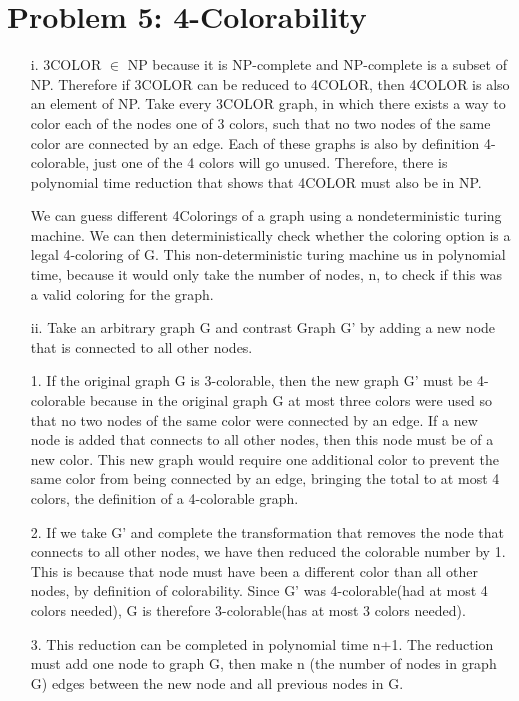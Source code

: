 \documentclass[10pt,letter]{article}
\begin{document}
\section*{Problem 5: 4-Colorability}
\begin{enumerate}
\item[i.] 3COLOR $\in$ NP because it is NP-complete and NP-complete is a subset of NP. Therefore if 3COLOR can be reduced to 4COLOR, then 4COLOR is also an element of NP. Take every 3COLOR graph, in which there exists a way to color each of the nodes one of 3 colors, such that no two nodes of the same color are connected by an edge. Each of these graphs is also by definition 4-colorable, just one of the 4 colors will go unused. Therefore, there is polynomial time reduction that shows that 4COLOR must also be in NP. 

We can guess different 4Colorings of a graph using a nondeterministic turing machine. We can then deterministically check whether the coloring option is a legal 4-coloring of G. This non-deterministic turing machine us in polynomial time, because it would only take the number of nodes, n, to check if this was a valid coloring for the graph. 
\item[ii.]
Take an arbitrary graph G and contrast Graph G' by adding a new node that is connected to all other nodes. 
\item[1.] If the original graph G is 3-colorable, then the new graph G' must be 4-colorable because in the original graph G at most three colors were used so that no two nodes of the same color were connected by an edge. If a new node is added that connects to all other nodes, then this node must be of a new color. This new graph would require one additional color to prevent the same color from being connected by an edge, bringing the total to at most 4 colors, the definition of  a 4-colorable graph. 
\item[2.]
If we take G' and complete the transformation that removes the node that connects to all other nodes, we have then reduced the colorable number by 1. This is because that node must have been a different color than all other nodes, by definition of colorability. Since G' was 4-colorable(had at most 4 colors needed), G is therefore 3-colorable(has at most 3 colors needed). 
\item[3.]
This reduction can be completed in polynomial time n+1. The reduction must add one node to graph G, then make n (the number of nodes in graph G) edges between the new node and all previous nodes in G. 
\end{enumerate}
\end{document}
